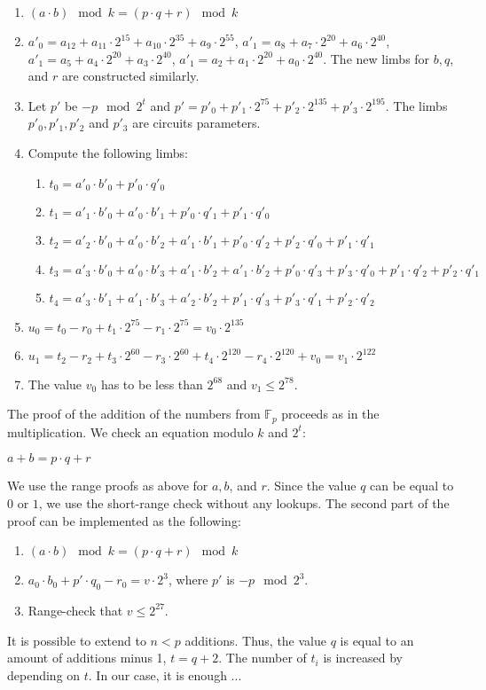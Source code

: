 \begin{enumerate}
\item $(a\cdot b) \mod k = (p \cdot q + r) \mod k$
\item $a'_0 = a_{12} + a_{11} \cdot 2^{15} + a_{10} \cdot 2^{35} + a_9 \cdot 2^{55}$, $a'_1 = a_8 + a_7 \cdot 2^{20} + a_6 \cdot 2^{40}$, $a'_1 = a_5 + a_4 \cdot 2^{20} + a_3 \cdot 2^{40}$, $a'_1 = a_2 + a_1 \cdot 2^{20} + a_0 \cdot 2^{40}$.
The new limbs for  $b, q$, and $r$ are constructed similarly.
\item Let $p'$ be $-p \mod 2^t$ and $p' = p'_{0} + p'_{1}\cdot 2^{75} + p'_2 \cdot 2^{135}+ p'_3 \cdot 2^{195}$. The limbs $p'_0, p'_1, p'_2$ and $p'_3$ are circuits parameters.
\item Compute the following limbs:
	\begin{enumerate}
	\item $t_0 = a'_0 \cdot b'_0 + p'_0 \cdot q'_0$
	\item $t_1 = a'_1 \cdot b'_0 + a'_0 \cdot b'_1 + p'_0 \cdot q'_1 + p'_1 \cdot q'_0$
	\item $t_2 = a'_2 \cdot b'_0 + a'_0 \cdot b'_2 + a'_1 \cdot b'_1 + p'_0 \cdot q'_2 + p'_2 \cdot q'_0+ p'_1 		\cdot q'_1$
	\item $t_3 = a'_3 \cdot b'_0 + a'_0 \cdot b'_3 + a'_1 \cdot b'_2 + a'_1 \cdot b'_2 + p'_0 \cdot q'_3 + p'_3 	\cdot q'_0+ p'_1 \cdot q'_2 + p'_2 \cdot q'_1$
	\item $t_4 = a'_3 \cdot b'_1 + a'_1 \cdot b'_3 + a'_2 \cdot b'_2 + p'_1 \cdot q'_3 + p'_3 \cdot q'_1+ p'_2 			\cdot q'_2$
	\end{enumerate}
\item $u_0 = t_0 - r_0 + t_1 \cdot 2^{75} - r_1 \cdot 2^{75} = v_0 \cdot 2^{135}$
\item $u_1 = t_2 - r_2 + t_3 \cdot 2^{60} - r_3 \cdot 2^{60} + t_4 \cdot 2^{120} - r_4 \cdot 2^{120} + v_0 = v_1 \cdot 2^{122}$
\item The value $v_0$ has to be less than $2^{68}$ and $v_1 \le 2^{78}$.
\end{enumerate}

The proof of the addition of the numbers from $\mathbb{F}_p$ proceeds as in the multiplication.
We check an equation modulo $k$ and $2^t$:
\begin{center}
$a + b = p\cdot q + r$
\end{center}
We use the range proofs as above for $a, b$, and $r$.
Since the value $q$ can be equal to $0$ or $1$, we use the short-range check without any lookups.
The second part of the proof can be implemented as the following:
\begin{enumerate}
\item $(a\cdot b) \mod k = (p \cdot q + r) \mod k$
\item $a_0 \cdot b_0 + p'\cdot q_0 - r_0 = v \cdot 2^3$, where $p'$ is $- p \mod 2^3$.
\item Range-check that $v \leq 2^{27}$.
\end{enumerate} 
It is possible to extend to $n < p$ additions.
Thus, the value $q$ is equal to an amount of additions minus 1, $t = q + 2$.
The number of $t_i $ is increased by depending on $t$.
In our case, it is enough ...

